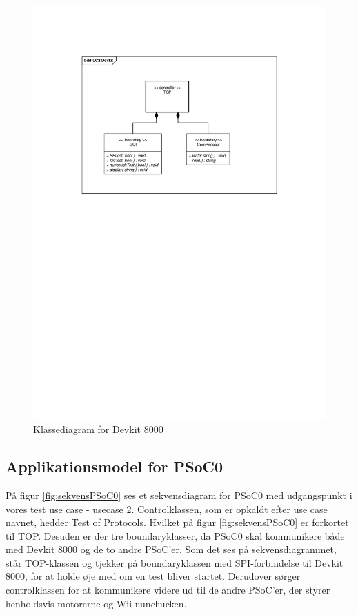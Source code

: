 \begin{figure}[H]
	\centering
	\includegraphics[trim = {3.2cm 16.1cm 3.2cm 3.5cm}, clip = true, width=\textwidth] {Systemarkitektur/images/klassediagramDevkit.pdf}
	\caption{Klassediagram for Devkit 8000}
	\label{fig:klasseDevkit}
\end{figure}

\subsection{Applikationsmodel for PSoC0}
På figur \ref{fig:sekvensPSoC0} ses et sekvensdiagram for PSoC0 med udgangspunkt i vores test use case - usecase 2. Controlklassen, som er opkaldt efter use case navnet, hedder Test of Protocols. Hvilket på figur \ref{fig:sekvensPSoC0} er forkortet til TOP. Desuden er der tre boundaryklasser, da PSoC0 skal kommunikere både med Devkit 8000 og de to andre PSoC'er. Som det ses på sekvensdiagrammet, står TOP-klassen og tjekker på boundaryklassen med SPI-forbindelse til Devkit 8000, for at holde øje med om en test bliver startet. Derudover sørger controlklassen for at kommunikere videre ud til de andre PSoC'er, der styrer henholdsvis motorerne og Wii-nunchucken. 

